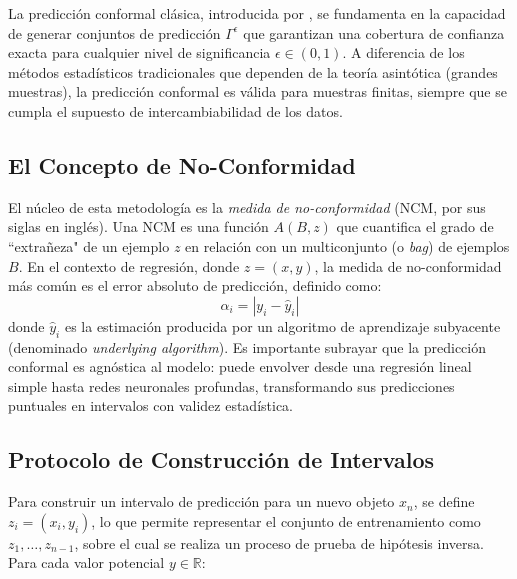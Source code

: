 La predicción conformal clásica, introducida por \textcite{Vovk2005}, se fundamenta en la capacidad de generar conjuntos de predicción $\Gamma^\epsilon$ que garantizan una cobertura de confianza exacta para cualquier nivel de significancia $\epsilon \in (0,1)$. A diferencia de los métodos estadísticos tradicionales que dependen de la teoría asintótica (grandes muestras), la predicción conformal es válida para muestras finitas, siempre que se cumpla el supuesto de intercambiabilidad de los datos.

\subsection{El Concepto de No-Conformidad}

El núcleo de esta metodología es la \textit{medida de no-conformidad} (NCM, por sus siglas en inglés). Una NCM es una función $A(B, z)$ que cuantifica el grado de ``extrañeza" de un ejemplo $z$ en relación con un multiconjunto (o \textit{bag}) de ejemplos $B$. En el contexto de regresión, donde $z = (x, y)$, la medida de no-conformidad más común es el error absoluto de predicción, definido como:
\begin{equation}
    \alpha_i = |y_i - \hat{y}_i|
\end{equation}
donde $\hat{y}_i$ es la estimación producida por un algoritmo de aprendizaje subyacente (denominado \textit{underlying algorithm}). Es importante subrayar que la predicción conformal es agnóstica al modelo: puede envolver desde una regresión lineal simple hasta redes neuronales profundas, transformando sus predicciones puntuales en intervalos con validez estadística.

\subsection{Protocolo de Construcción de Intervalos}

Para construir un intervalo de predicción para un nuevo objeto $x_n$, se define $z_i = (x_i, y_i)$, lo que permite representar el conjunto de entrenamiento como $z_1, \dots, z_{n-1}$, sobre el cual se realiza un proceso de prueba de hipótesis inversa. Para cada valor potencial $y \in \mathbb{R}$:


